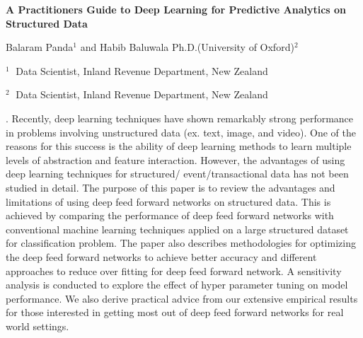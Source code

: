 \documentclass[12pt]{article}
\begin{document}
\begin{flushleft}


{\LARGE\bf A Practitioners Guide to Deep Learning for Predictive Analytics on Structured Data}


\vspace{1.0cm}

Balaram Panda$^1$ and Habib Baluwala Ph.D.(University of Oxford)$^2$

\begin{description}

\item $^1 \;$ Data Scientist, Inland Revenue Department, New Zealand

\item $^2 \;$ Data Scientist, Inland Revenue Department, New Zealand

\end{description}

\end{flushleft}


\vspace{0.75cm}

. Recently, deep learning techniques have shown remarkably strong performance in problems involving unstructured data (ex. text, image, and video). One of the reasons for this success is the ability of deep learning methods to learn multiple levels of abstraction and feature interaction. However, the advantages of using deep learning techniques for structured/ event/transactional data has not been studied in detail.  The purpose of this paper is to review the advantages and limitations of using deep feed forward networks on structured data. This is achieved by comparing the performance of deep feed forward networks with conventional machine learning techniques applied on a large structured dataset for classification problem. The paper also describes methodologies for optimizing the deep feed forward networks to achieve better accuracy and  different approaches to reduce over fitting for deep feed forward network. A sensitivity analysis is conducted to explore the effect of hyper parameter tuning on model performance.  We also derive practical advice from our extensive empirical results for those interested in getting most out of deep feed forward networks for real world settings.

\vskip 2mm
\end{document}
